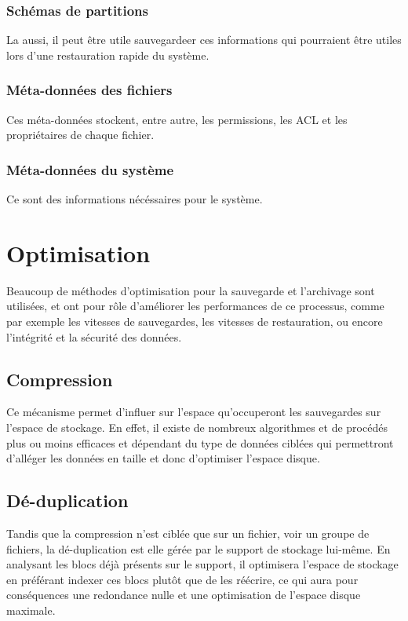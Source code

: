 \documentclass[a4paper,11pt]{report}
\begin{document}
\subsection{Schémas de partitions}
La aussi, il peut être utile sauvegardeer ces informations qui pourraient être utiles lors d'une restauration rapide du système.

\subsection{Méta-données des fichiers}
Ces méta-données stockent, entre autre, les permissions, les ACL et les propriétaires de chaque fichier. 

\subsection{Méta-données du système}
Ce sont des informations nécéssaires pour le système.

\chapter{Optimisation}
Beaucoup de méthodes d'optimisation pour la sauvegarde et l'archivage sont utilisées, et ont pour rôle d'améliorer les performances de ce processus, comme par exemple les vitesses de sauvegardes, les vitesses de restauration, ou encore l'intégrité et la sécurité des données.

\section{Compression}
Ce mécanisme permet d'influer sur l'espace qu'occuperont les sauvegardes sur l'espace de stockage. 
En effet, il existe de nombreux algorithmes et de procédés plus ou moins efficaces et dépendant du type de données ciblées qui permettront d'alléger les données en taille et donc d'optimiser l'espace disque.

\section{Dé-duplication}
Tandis que la compression n'est ciblée que sur un fichier, voir un groupe de fichiers, la dé-duplication est elle gérée par le support de stockage lui-même.
En analysant les blocs déjà présents sur le support, il optimisera l'espace de stockage en préférant indexer ces blocs plutôt que de les réécrire, ce qui aura pour conséquences une redondance nulle et une optimisation de l'espace disque maximale. 
\end{document}
